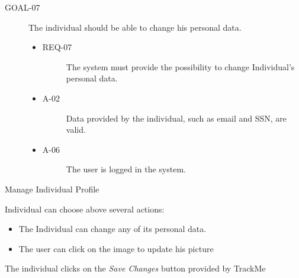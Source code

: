 \documentclass[a4paper]{article}
\newcommand{\requirement}{\ding{229}}%
\begin{document}
       \begin{description}
        	\item[GOAL-07] The individual should be able to change his personal data. 
            	\begin{itemize}
            	    \item[\requirement]
                	\begin{description}
                	\item[REQ-07] The system must provide the possibility to change Individual's personal data. 
                	\end{description}
                	\item
                	\begin{description}
                	\item[A-02] Data provided by the individual, such as email and SSN, are valid.
                	\end{description}
                	\item
                	\begin{description}
                	\item[A-06] The user is logged in the system.
                	\end{description}
                	\end{itemize}
        \end{description}
      
      
       \begin{usecase}{Manage Individual Profile}
        {Individual can choose above several actions:
            \begin{itemize}
            \item The Individual can change any of its personal data.
            \item The user can click on the image to update his picture
        \end{itemize}}
        {The individual clicks on the \textit{Save Changes} button provided by TrackMe}
       \end{usecase}
       
\end{document}
